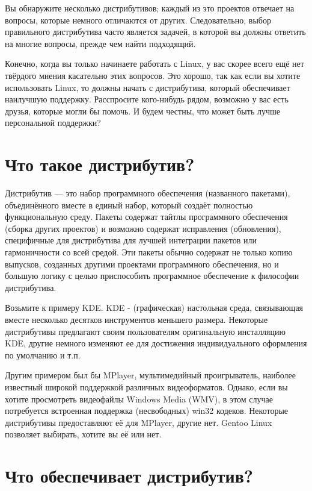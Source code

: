 \documentclass[12pt]{book}
\begin{document}
Вы обнаружите несколько дистрибутивов; каждый из это проектов отвечает на вопросы, которые немного отличаются от других. Следовательно, выбор правильного дистрибутива часто является задачей, в которой вы должны ответить на многие вопросы, прежде чем найти подходящий.

Конечно, когда вы только начинаете работать с Linux, у вас скорее всего ещё нет твёрдого мнения касательно этих вопросов. Это хорошо, так как если вы хотите  использовать Linux, то должны начать с дистрибутива, который обеспечивает наилучшую поддержку. Расспросите кого-нибудь рядом, возможно у вас есть друзья, которые могли бы помочь. И будем честны, что может быть лучше персональной поддержки?

\section{Что такое дистрибутив?}

Дистрибутив --- это набор программного обеспечения (названного пакетами), объединённого вместе в единый набор, который создаёт полностью функциональную среду. Пакеты содержат тайтлы программного обеспечения (сборка других проектов) и возможно содержат исправления (обновления), специфичные для дистрибутива для лучшей интеграции пакетов или гармоничности со всей средой. Эти пакеты обычно содержат не только копию выпусков, созданных другими проектами программного обеспечения, но и большую логику с целью приспособить программное обеспечение к  философии дистрибутива.

Возьмите к примеру KDE. KDE - (графическая) настольная среда, связывающая вместе несколько десятков инструментов меньшего размера. Некоторые дистрибутивы предлагают своим пользователям оригинальную инсталляцию KDE, другие немного изменяют ее для достижения индивидуального оформления по умолчанию и т.п.

Другим примером был бы MPlayer, мультимедийный проигрыватель, наиболее известный широкой поддержкой различных видеоформатов. Однако, если вы хотите просмотреть видеофайлы Windows Media (WMV), в этом случае потребуется встроенная поддержка (несвободных) win32 кодеков. Некоторые дистрибутивы предоставляют её для MPlayer, другие нет. Gentoo Linux позволяет выбирать, хотите вы её или нет.

\section{Что обеспечивает дистрибутив?}
\end{document}
